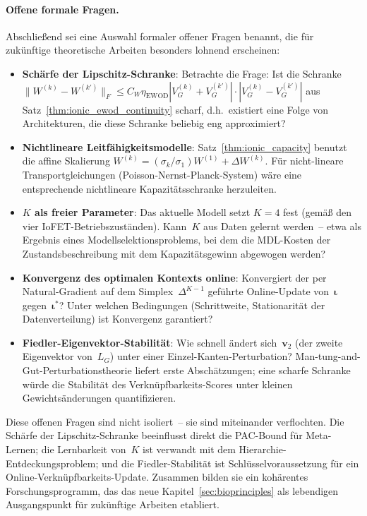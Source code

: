 \documentclass[12pt, a4paper, openany]{report}
\begin{document}
\paragraph{Offene formale Fragen.}
Abschließend sei eine Auswahl formaler offener Fragen benannt, die für
zukünftige theoretische Arbeiten besonders lohnend erscheinen:
\begin{itemize}
  \item \textbf{Schärfe der Lipschitz-Schranke}: Betrachte die Frage: Ist die Schranke
    $\|W^{(k)} - W^{(k')}\|_F \leq C_W \eta_{\text{EWOD}}
    |V_G^{(k)} + V_G^{(k')}| \cdot |V_G^{(k)} - V_G^{(k')}|$
    aus Satz~\ref{thm:ionic_ewod_continuity} scharf, d.h.\ existiert eine
    Folge von Architekturen, die diese Schranke beliebig eng approximiert?
  \item \textbf{Nichtlineare Leitfähigkeitsmodelle}: Satz~\ref{thm:ionic_capacity}
    benutzt die affine Skalierung $W^{(k)} = (\sigma_k/\sigma_1) W^{(1)} + \Delta W^{(k)}$.
    Für nicht-lineare Transportgleichungen (Poisson-Nernst-Planck-System) wäre
    eine entsprechende nichtlineare Kapazitätsschranke herzuleiten.
  \item \textbf{$K$ als freier Parameter}: Das aktuelle Modell setzt $K=4$
    fest (gemäß den vier IoFET-Betriebszuständen). Kann~$K$ aus Daten gelernt
    werden~-- etwa als Ergebnis eines Modellselektionsproblems, bei dem die
    MDL-Kosten der Zustandsbeschreibung mit dem Kapazitätsgewinn abgewogen werden?
  \item \textbf{Konvergenz des optimalen Kontexts online}: Konvergiert
    der per Natural-Gradient auf dem Simplex~$\Delta^{K-1}$ geführte
    Online-Update von~$\bm{\iota}$ gegen~$\bm{\iota}^*$?  Unter welchen
    Bedingungen (Schrittweite, Stationarität der Datenverteilung) ist
    Konvergenz garantiert?
  \item \textbf{Fiedler-Eigenvektor-Stabilität}: Wie schnell ändert sich~$\bm{v}_2$
    (der zweite Eigenvektor von~$L_G$) unter einer Einzel-Kanten-Perturbation?
    Man-tung-and-Gut-Perturbations\-theorie \cite{chung97} liefert erste
    Abschätzungen; eine scharfe Schranke würde die Stabilität des
    Verknüpfbarkeits-Scores unter kleinen Gewichtsänderungen quantifizieren.
\end{itemize}
Diese offenen Fragen sind nicht isoliert~-- sie sind miteinander verflochten.
Die Schärfe der Lipschitz-Schranke beeinflusst direkt die PAC-Bound für
Meta-Lernen; die Lernbarkeit von~$K$ ist verwandt mit dem Hierarchie-Entdeckungs\-problem;
und die Fiedler-Stabilität ist Schlüsselvoraussetzung für ein
Online-Verknüpfbarkeits-Update.  Zusammen bilden sie ein kohärentes
Forschungsprogramm, das das neue Kapitel~\ref{sec:bioprinciples} als
lebendigen Ausgangspunkt für zukünftige Arbeiten etabliert.
\end{document}
